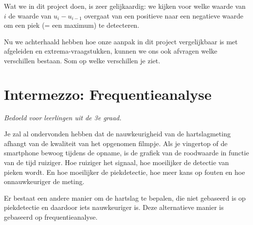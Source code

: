 Wat we in dit project doen, is zeer gelijkaardig: we kijken voor welke waarde van $i$ de waarde van $u_{i}-u_{i-1}$ overgaat van een positieve naar een negatieve waarde om een piek (= een maximum) te detecteren. 

\begin{oef}
	Nu we achterhaald hebben hoe onze aanpak in dit project vergelijkbaar is met afgeleiden en extrema-vraagstukken, kunnen we ons ook afvragen welke verschillen bestaan. Som op welke verschillen je ziet.
\end{oef}

\section{Intermezzo: Frequentieanalyse}
\label{sec:Mod4_Sec3}
%
\emph{Bedoeld voor leerlingen uit de 3e graad.}

Je zal al ondervonden hebben dat de nauwkeurigheid van de hartslagmeting afhangt van de kwaliteit van het opgenomen filmpje. Als je vingertop of de smartphone bewoog tijdens de opname, is de grafiek van de roodwaarde in functie van de tijd ruiziger. Hoe ruiziger het signaal, hoe moeilijker de detectie van pieken wordt. En hoe moeilijker de piekdetectie, hoe meer kans op fouten en hoe onnauwkeuriger de meting.

Er bestaat een andere manier om de hartslag te bepalen, die niet gebaseerd is op piekdetectie en daardoor iets nauwkeuriger is. Deze alternatieve manier is gebaseerd op frequentieanalyse.


